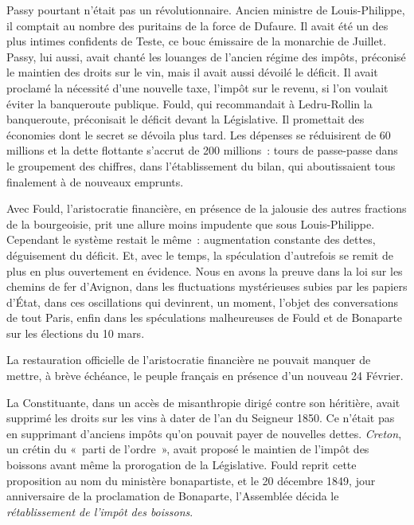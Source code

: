 \documentclass[french,twoside]{book} %
\begin{document}
Passy pourtant n’était pas un révolutionnaire. Ancien ministre de Louis-Philippe, il comptait au nombre des puritains de la force de Dufaure. Il avait été un des plus intimes confidents de Teste, ce bouc émissaire de la monarchie de Juillet. Passy, lui aussi, avait chanté les louanges de l’ancien régime des impôts, préconisé le maintien des droits sur le vin, mais il avait aussi dévoilé le déficit. Il avait proclamé la nécessité d’une nouvelle taxe, l’impôt sur le revenu, si l’on voulait éviter la banqueroute publique. Fould, qui recommandait à Ledru-Rollin la banqueroute, préconisait le déficit devant la Législative. Il promettait des économies dont le secret se dévoila plus tard. Les dépenses se réduisirent de 60 millions et la dette flottante s’accrut de 200 millions : tours de passe-passe dans le groupement des chiffres, dans l’établissement du bilan, qui aboutissaient tous finalement à de nouveaux emprunts.\par
Avec Fould, l’aristocratie financière, en présence de la jalousie des autres fractions de la bourgeoisie, prit une allure moins impudente que sous Louis-Philippe. Cependant le système restait le même : augmentation constante des dettes, déguisement du déficit. Et, avec le temps, la spéculation d’autrefois se remit de plus en plus ouvertement en évidence. Nous en avons la preuve dans la loi sur les chemins de fer d’Avignon, dans les fluctuations mystérieuses subies par les papiers d’État, dans ces oscillations qui devinrent, un moment, l’objet des conversations de tout Paris, enfin dans les spéculations malheureuses de Fould et de Bonaparte sur les élections du 10 mars.\par
La restauration officielle de l’aristocratie financière ne pouvait manquer de mettre, à brève échéance, le peuple français en présence d’un nouveau 24 Février.\par
La Constituante, dans un accès de misanthropie dirigé contre son héritière, avait supprimé les droits sur les vins à dater de l’an du Seigneur 1850. Ce n’était pas en supprimant d’anciens impôts qu’on pouvait payer de nouvelles dettes. \emph{Creton}, un crétin du « parti de l’ordre », avait proposé le maintien de l’impôt des boissons avant même la prorogation de la Législative. Fould reprit cette proposition au nom du ministère bonapartiste, et le 20 décembre 1849, jour anniversaire de la proclamation de Bonaparte, l’Assemblée décida le \emph{rétablissement de l’impôt des boissons}.\par
\end{document}
